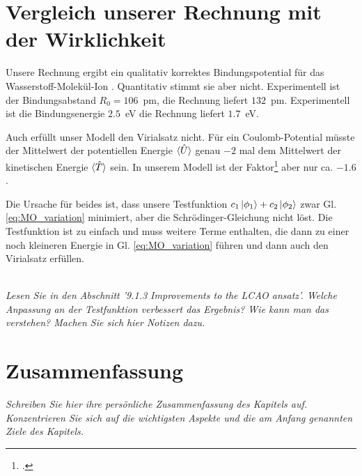 \section{Vergleich unserer Rechnung mit der Wirklichkeit}

Unsere Rechnung ergibt ein qualitativ korrektes Bindungspotential für das  Wasserstoff-Molekül-Ion  . Quantitativ stimmt sie aber nicht. Experimentell ist der Bindungsabstand $R_0 = 106$~pm, die Rechnung liefert $132$~pm. Experimentell ist die Bindungsenergie $2.5$~eV die Rechnung liefert $1.7$~eV.

Auch erfüllt unser Modell den Virialsatz nicht. Für ein Coulomb-Potential müsste der Mittelwert der potentiellen Energie $\braket{\hat{U}}$ genau $-2$ mal dem Mittelwert der kinetischen  Energie $\braket{\hat{T}}$ sein. In unserem Modell ist der Faktor\footcite{McQuarrie2008} aber nur ca. $-1.6$.

Die Ursache für beides ist, dass unsere Testfunktion $c_1 \ket{\phi_1} + c_2 \ket{\phi_2}$ zwar 
Gl.  \ref{eq:MO_variation} minimiert, aber die Schrödinger-Gleichung nicht löst. 
 Die Testfunktion ist zu einfach und muss weitere Terme enthalten, die dann zu einer noch kleineren Energie in Gl.  \ref{eq:MO_variation} führen und dann auch den Virialsatz erfüllen.



\ \\

\textit{Lesen Sie in \cite{Demtröder_AMP}  den Abschnitt '9.1.3 Improvements to the LCAO ansatz'. Welche Anpassung an der Testfunktion verbessert das Ergebnis? Wie kann man das verstehen? Machen Sie sich hier Notizen dazu.
}

\vspace*{10cm}


\newpage

\section{Zusammenfassung}

\textit{Schreiben Sie hier ihre persönliche Zusammenfassung des Kapitels auf. Konzentrieren Sie sich auf die wichtigsten Aspekte und die am Anfang genannten Ziele des Kapitels.}


\vspace*{10cm}


\printbibliography[segment=\therefsegment,heading=subbibliography]

